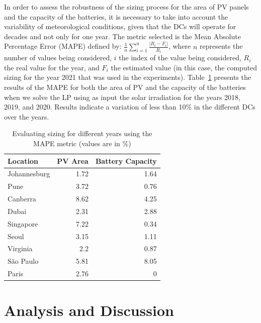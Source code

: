 In order to assess the robustness of the sizing process for the area of PV panels and the capacity of the batteries, it is necessary to take into account the variability of meteorological conditions, given that the DCs will operate for decades and not only for one year. The metric selected is the Mean Absolute Percentage Error (MAPE)  defined by: $ \frac{1}{n}\sum_{i=1}^{n}  \frac{| R_{i} - F_{i}|}{R_{i}}$, where $n$ represents the number of values being considered, $i$ the index of the value being considered, $R_{i}$ the real value for the year, and $F_{i}$ the estimated value (in this case, the computed sizing for the year 2021 that was used in the experiments). Table~\ref{tab:years_MAPE} presents the results of the MAPE for both the area of PV and the capacity of the batteries when we solve the LP using as input the solar irradiation for the years 2018, 2019, and 2020. Results indicate a variation of less than 10\% in the different DCs over the years.

\begin{table}[h]
  
  \caption{Evaluating sizing for different years using the MAPE metric (values are in \%) }\label{tab:years_MAPE} \centering

  \begin{tabular}{|l|r|r|}
   \hline
    
  \textbf{Location} &   \textbf{PV Area} & \textbf{Battery Capacity} \\
  \hline
  Johannesburg & 1.72 & 1.64  \\
  \hline
  Pune  & 3.72 & 0.76  \\
  \hline
  Canberra  & 8.62 & 4.25 \\
  \hline
  Dubai   & 2.31 & 2.88   \\
  \hline
  Singapore & 7.22 & 0.34 \\
  \hline     
  Seoul    & 3.15 & 1.11 \\
  \hline
  Virginia   & 2.2 & 0.87 \\
  \hline
  São Paulo   & 5.81 & 8.05 \\
  \hline 
  Paris    & 2.76 & 0     \\
  \hline  

\end{tabular}  
\end{table}


\section{Analysis and Discussion}
\label{sec:analysis-discussion_ccgrid}

